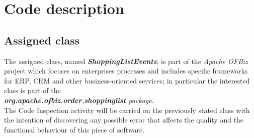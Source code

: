 \documentclass[11pt,a4paper]{report}
\begin{document}


\thispagestyle{empty}
\tableofcontents
\cleardoublepage
{}
\pagestyle{fancy}

\chapter{Code description}
\section{Assigned class}
The assigned class, named \textbf{\textit{ShoppingListEvents}}, is part of the \textit{Apache OFBiz} project which focuses on enterprises processes and includes specific frameworks for ERP, CRM and other business-oriented services;
in particular the interested class is part of the \\ \textit{\textbf{org.apache.ofbiz.order.shoppinglist} package}.\\
The Code Inspection activity will be carried on the previously stated class with the intention of discovering any possible error that affects the quality and the functional behaviour of this piece of software.
\end{document}
